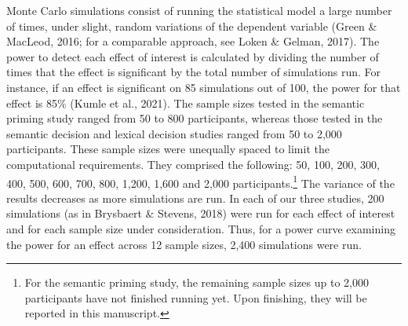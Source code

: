 \documentclass[
  12pt,
  man,floatsintext]{apa7}
\begin{document}
Monte Carlo simulations consist of running the statistical model a large number of times, under slight, random variations of the dependent variable (Green \& MacLeod, 2016; for a comparable approach, see Loken \& Gelman, 2017). The power to detect each effect of interest is calculated by dividing the number of times that the effect is significant by the total number of simulations run. For instance, if an effect is significant on 85 simulations out of 100, the power for that effect is 85\% (Kumle et al., 2021). The sample sizes tested in the semantic priming study ranged from 50 to 800 participants, whereas those tested in the semantic decision and lexical decision studies ranged from 50 to 2,000 participants. These sample sizes were unequally spaced to limit the computational requirements. They comprised the following: 50, 100, 200, 300, 400, 500, 600, 700, 800, 1,200, 1,600 and 2,000 participants.\footnote{For the semantic priming study, the remaining sample sizes up to 2,000 participants have not finished running yet. Upon finishing, they will be reported in this manuscript.} The variance of the results decreases as more simulations are run. In each of our three studies, 200 simulations (as in Brysbaert \& Stevens, 2018) were run for each effect of interest and for each sample size under consideration. Thus, for a power curve examining the power for an effect across 12 sample sizes, 2,400 simulations were run.
\end{document}

